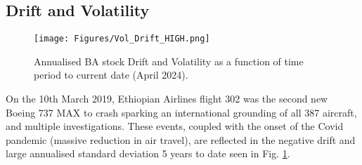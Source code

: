 \documentclass[
	a4paper, %
	11pt, %
	twoside, %
]{LTJournalArticle}
\begin{document}
\subsection{Drift and Volatility}
\label{sec:DRift_VOl}
\begin{figure}[ht]
	\texttt{[image: Figures/Vol\_Drift\_HIGH.png]}
	\caption{Annualised BA stock Drift and Volatility as a function of time period to current date (April 2024).}
	\label{fig:VolDri}
\end{figure}
\noindent On the 10th March 2019, Ethiopian Airlines flight 302 was the second new Boeing 737 MAX to crash sparking an international grounding of all 387 aircraft, and multiple investigations.
These events, coupled with the onset of the Covid pandemic (massive reduction in air travel), are reflected in the negative drift and large annualised standard deviation 5 years to date seen in Fig. \ref{fig:VolDri}.
\end{document}
